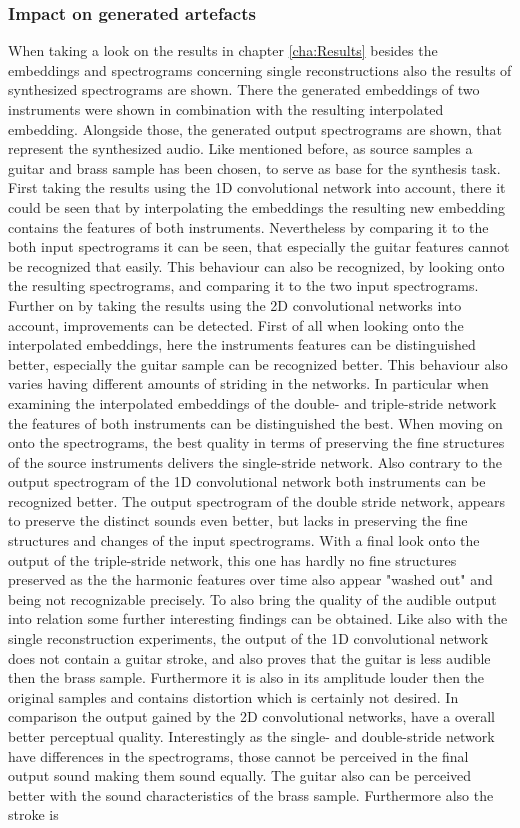 \subsubsection{Impact on generated artefacts}
When taking a look on the results in chapter \ref{cha:Results} besides the embeddings and spectrograms concerning single reconstructions also the results of synthesized spectrograms are shown. There the generated embeddings of two instruments were shown in combination with the resulting interpolated embedding. Alongside those, the generated output spectrograms are shown, that represent the synthesized audio. Like mentioned before, as source samples a guitar and brass sample has been chosen, to serve as base for the synthesis task. First taking the results using the 1D convolutional network into account, there it could be seen that by interpolating the embeddings the resulting new embedding contains the features of both instruments. Nevertheless by comparing it to the both input spectrograms it can be seen, that especially the guitar features cannot be recognized that easily. This behaviour can also be recognized, by looking onto the resulting spectrograms, and comparing it to the two input spectrograms. Further on by taking the results using the 2D convolutional networks into account, improvements can be detected. First of all when looking onto the interpolated embeddings, here the instruments features can be distinguished better, especially the guitar sample can be recognized better. This behaviour also varies having different amounts of striding in the networks. In particular when examining the interpolated embeddings of the double- and triple-stride network the features of both instruments can be distinguished the best. When moving on onto the spectrograms, the best quality in terms of preserving the fine structures of the source instruments delivers the single-stride network. Also contrary to the output spectrogram of the 1D convolutional network both instruments can be recognized better. The output spectrogram of the double stride network, appears to preserve the distinct sounds even better, but lacks in preserving the fine structures and changes of the input spectrograms. With a final look onto the output of the triple-stride network, this one has hardly no fine structures preserved as the the harmonic features over time also appear "washed out" and being not recognizable precisely. To also bring the quality of the audible output into relation some further interesting findings can be obtained. Like also with the single reconstruction experiments, the output of the 1D convolutional network does not contain a guitar stroke, and also proves that the guitar is less audible then the brass sample. Furthermore it is also in its amplitude louder then the original samples and contains distortion which is certainly not desired. In comparison the output gained by the 2D convolutional networks, have a overall better perceptual quality. Interestingly as the single- and double-stride network have differences in the spectrograms, those cannot be perceived in the final output sound making them sound equally. The guitar also can be perceived better with the sound characteristics of the brass sample. Furthermore also the stroke is 